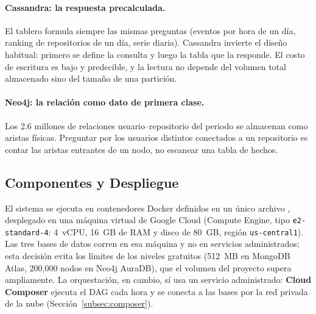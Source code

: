 \paragraph{Cassandra: la respuesta precalculada.} El tablero formula siempre las mismas preguntas (eventos por hora de un día, ranking de repositorios de un día, serie diaria). Cassandra invierte el diseño habitual: primero se define la consulta y luego la tabla que la responde. El costo de escritura es bajo y predecible, y la lectura no depende del volumen total almacenado sino del tamaño de una partición.

\paragraph{Neo4j: la relación como dato de primera clase.} Los 2.6 millones de relaciones usuario--repositorio del periodo se almacenan como aristas físicas. Preguntar por los usuarios distintos conectados a un repositorio es contar las aristas entrantes de un nodo, no escanear una tabla de hechos.

\subsection{Componentes y Despliegue}

El sistema se ejecuta en contenedores Docker definidos en un único archivo , desplegado en una máquina virtual de Google Cloud (Compute Engine, tipo \texttt{e2-standard-4}: 4~vCPU, 16~GB de RAM y disco de 80~GB, región \texttt{us-central1}). Las tres bases de datos corren en esa máquina y no en servicios administrados; esta decisión evita los límites de los niveles gratuitos (512~MB en MongoDB Atlas, 200,000 nodos en Neo4j AuraDB), que el volumen del proyecto supera ampliamente. La orquestación, en cambio, sí usa un servicio administrado: \textbf{Cloud Composer} ejecuta el DAG cada hora y se conecta a las bases por la red privada de la nube (Sección~\ref{subsec:composer}).

